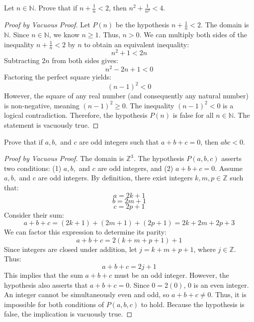 \documentclass[11pt]{article}
\theoremstyle{remark}
\begin{document}
\begin{problem}[3.5]
Let $n \in \mathbb{N}$. Prove that if $n + \frac{1}{n} < 2$, then $n^2 + \frac{1}{n^2} < 4$.
\end{problem}
\begin{proof}[Proof by Vacuous Proof]
Let $P(n)$ be the hypothesis $n + \frac{1}{n} < 2$. The domain is $\mathbb{N}$.
Since $n \in \mathbb{N}$, we know $n \ge 1$. Thus, $n > 0$. We can multiply both sides of the inequality $n + \frac{1}{n} < 2$ by $n$ to obtain an equivalent inequality:
\[ n^2 + 1 < 2n \]
Subtracting $2n$ from both sides gives:
\[ n^2 - 2n + 1 < 0 \]
Factoring the perfect square yields:
\[ (n - 1)^2 < 0 \]
However, the square of any real number (and consequently any natural number) is non-negative, meaning $(n - 1)^2 \ge 0$. The inequality $(n - 1)^2 < 0$ is a logical contradiction. Therefore, the hypothesis $P(n)$ is false for all $n \in \mathbb{N}$. The statement is vacuously true.
\end{proof}

\begin{problem}[3.6]
Prove that if $a, b,$ and $c$ are odd integers such that $a + b + c = 0$, then $abc < 0$.
\end{problem}
\begin{proof}[Proof by Vacuous Proof]
The domain is $\mathbb{Z}^3$. The hypothesis $P(a,b,c)$ asserts two conditions: (1) $a, b,$ and $c$ are odd integers, and (2) $a + b + c = 0$. 
Assume $a, b,$ and $c$ are odd integers. By definition, there exist integers $k, m, p \in \mathbb{Z}$ such that:
\[ a = 2k + 1 \]
\[ b = 2m + 1 \]
\[ c = 2p + 1 \]
Consider their sum:
\[ a + b + c = (2k + 1) + (2m + 1) + (2p + 1) = 2k + 2m + 2p + 3 \]
We can factor this expression to determine its parity:
\[ a + b + c = 2(k + m + p + 1) + 1 \]
Since integers are closed under addition, let $j = k + m + p + 1$, where $j \in \mathbb{Z}$. Thus:
\[ a + b + c = 2j + 1 \]
This implies that the sum $a + b + c$ must be an odd integer. However, the hypothesis also asserts that $a + b + c = 0$. Since $0 = 2(0)$, $0$ is an even integer. An integer cannot be simultaneously even and odd, so $a + b + c \neq 0$. Thus, it is impossible for both conditions of $P(a,b,c)$ to hold. Because the hypothesis is false, the implication is vacuously true.
\end{proof}
\end{document}
